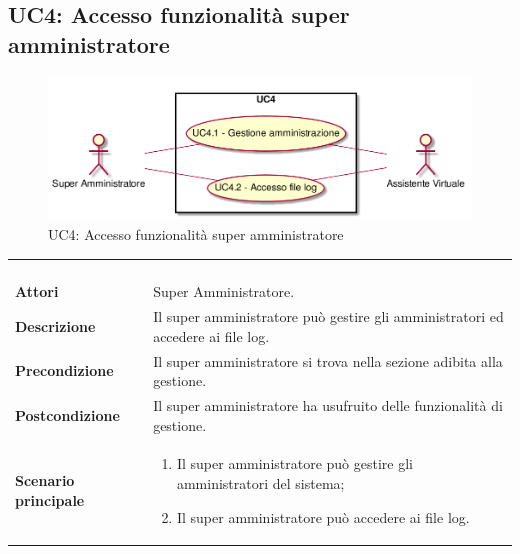 \newpage\subsection{UC4: Accesso funzionalità super amministratore}
\label{UC4}
\begin{figure}[h]
\centering
\includegraphics[width=\textwidth,height=\textheight,keepaspectratio]{images/UseCaseUC4.png}
\caption{UC4: Accesso funzionalità super amministratore}
\end{figure}
\begin{longtable}{l|p{10cm}}
\rowcolor[gray]{0.8} \multicolumn{2}{c}{} \\
\rowcolor[gray]{0.8} \multicolumn{2}{c}{\textbf{UC4 - Accesso funzionalità super amministratore}} \\
\rowcolor[gray]{0.8} \multicolumn{2}{c}{} \\
\hline
&\\
\textbf{Attori} & Super Amministratore.\\[7pt]
\textbf{Descrizione} & Il super amministratore può gestire gli amministratori ed accedere ai file log.\\[7pt]
\textbf{Precondizione} & Il super amministratore si trova nella sezione adibita alla gestione.\\[7pt]
\textbf{Postcondizione} & Il super amministratore ha usufruito delle funzionalità di gestione.\\[7pt]
\textbf{Scenario principale} &\begin{enumerate}
\item  Il super amministratore può gestire gli amministratori del sistema; 
\item  Il super amministratore può accedere ai file log.
\end{enumerate}
\\[7pt]\hline
\end{longtable}

